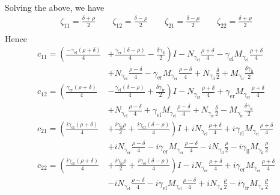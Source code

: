 Solving the above, we have
\begin{gather*}
  \zeta_{11} = \frac{\delta + \rho}{2} \qquad \zeta_{12} = \frac{\delta - \rho}{2} \qquad  \zeta_{21} = \frac{\delta - \rho}{2} \qquad \zeta_{22} = \frac{\delta + \rho}{2}\\
\end{gather*}
Hence
\begin{align*}
  c_{11} = \left(\frac{-\gamma_\text{el} (\rho+\delta)}{4}\right.&\left.+\frac{\gamma_\text{er} (\delta-\rho)}{4}-\frac{\delta \gamma_\text{il}}{2}\right) I -N_{\gamma_\text{el}} \frac{\rho+\delta}{4}-\gamma_\text{el} M_{\gamma_\text{el}} \frac{\rho+\delta}{4} \\
  &+N_{\gamma_\text{er}} \frac{\rho-\delta}{4}-\gamma_\text{er} M_{\gamma_\text{er}} \frac{\rho-\delta}{4}+N_{\gamma_\text{il}}\frac{\delta}{2}+M_{\gamma_\text{il}}\frac{\delta \gamma_\text{il}}{2} \\
  c_{12} = \left(\frac{\gamma_\text{er} (\rho+\delta)}{4}\right.&\left.-\frac{\gamma_\text{el} (\delta-\rho)}{4}+\frac{\delta \gamma_\text{ir}}{2}\right) I -N_{\gamma_\text{er}} \frac{\rho+\delta}{4} + \gamma_\text{er} M_{\gamma_\text{er}} \frac{\rho+\delta}{4} \\
  &+N_{\gamma_\text{el}} \frac{\rho-\delta}{4}+\gamma_\text{el} M_{\gamma_\text{el}} \frac{\rho-\delta}{4}+N_{\gamma_\text{ir}}\frac{\delta}{2}-M_{\gamma_\text{ir}}\frac{\delta\gamma_\text{ir}}{2}  \\
  c_{21} = \left(\frac{i \gamma_\text{el} (\rho+\delta)}{4}\right.&\left.+\frac{i \gamma_\text{il} \rho}{2}+\frac{i \gamma_\text{er} (\delta-\rho)}{4}\right) I +i N_{\gamma_\text{el}} \frac{\rho+\delta}{4}+i \gamma_\text{el} M_{\gamma_\text{el}} \frac{\rho+\delta}{4} \\
  &+i N_{\gamma_\text{er}} \frac{\rho-\delta}{4}-i \gamma_\text{er} M_{\gamma_\text{er}} \frac{\rho-\delta}{4}-i N_{\gamma_\text{il}} \frac{\rho}{2}-i \gamma_\text{il} M_{\gamma_\text{il}} \frac{\rho}{2} \\
  c_{22} = \left(\frac{i \gamma_\text{er} (\rho+\delta)}{4}\right.&\left.+\frac{i \gamma_\text{ir} \rho}{2}+\frac{i \gamma_\text{el} (\delta-\rho)}{4}\right) I -i N_{\gamma_\text{er}} \frac{\rho+\delta}{4}+i \gamma_\text{er} M_{\gamma_\text{er}} \frac{\rho+\delta}{4} \\
  &-i N_{\gamma_\text{el}} \frac{\rho-\delta}{4}-i \gamma_\text{el} M_{\gamma_\text{el}} \frac{\rho-\delta}{4}+i N_{\gamma_\text{ir}} \frac{\rho}{2}-i \gamma_\text{ir} M_{\gamma_\text{ir}} \frac{\rho}{2} \\
\end{align*}
